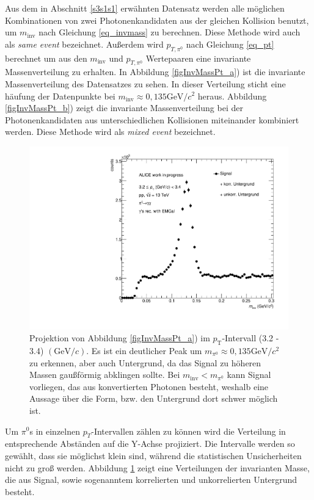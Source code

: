 Aus dem in Abschnitt \ref{s3s1s1} erw{\"a}hnten Datensatz werden alle m{\"o}glichen Kombinationen von zwei Photonenkandidaten aus der gleichen Kollision benutzt, um $m_{\text{inv}}$ nach Gleichung \ref{eq_invmass} zu berechnen.
Diese Methode wird auch als {\it same event} bezeichnet.
Au{\ss}erdem wird $p_{T,\pi^{0}}$ nach Gleichung \ref{eq_pt} berechnet um aus den $m_{\text{inv}}$ und $p_{T,\pi^{0}}$ Wertepaaren eine invariante Massenverteilung zu erhalten.
In Abbildung \ref{figInvMassPt_a}) ist die invariante Massenverteilung des Datensatzes zu sehen.
In dieser Verteilung sticht eine h{\"a}ufung der Datenpunkte bei $m_{\text{inv}}\approx 0,135\text{GeV/}c^{2}$ heraus.
Abbildung \ref{figInvMassPt_b}) zeigt die invariante Massenverteilung bei der Photonenkandidaten aus unterschiedlichen Kollisionen miteinander kombiniert werden.
Diese Methode wird als {\it mixed event} bezeichnet.
\begin{figure}[tbp]
\centering
\includegraphics[width=.6\linewidth]{hSignalPlusBkg.pdf}
\caption{Projektion von Abbildung \ref{figInvMassPt_a}) im $p_{\text{T}}$-Intervall (3.2 - 3.4) $(\text{GeV/}c)$. Es ist ein deutlicher Peak um $m_{\pi^{0}} \approx 0,135\text{GeV/}c^{2}$ zu erkennen, aber auch Untergrund, da das Signal zu h{\"o}heren Massen gau{\ss}f{\"o}rmig abklingen sollte. Bei $m_{\text{inv}} < m_{\pi^{0}}$ kann Signal vorliegen, das aus konvertierten Photonen besteht, weshalb eine Aussage {\"u}ber die Form, bzw. den Untergrund dort schwer m{\"o}glich ist.}
\label{figSignalPlusBkg}
\end{figure}
Um $\pi^{0}$s in einzelnen $p_{T}$-Intervallen z{\"a}hlen zu k{\"o}nnen wird die Verteilung in entsprechende Abst{\"a}nden auf die Y-Achse projiziert.
Die Intervalle werden so gew{\"a}hlt, dass sie m{\"o}glichst klein sind, w{\"a}hrend die statistischen Unsicherheiten nicht zu gro{\ss} werden.
Abbildung \ref{figSignalPlusBkg} zeigt eine Verteilungen der invarianten Masse, die aus Signal, sowie sogenanntem korrelierten und unkorrelierten Untergrund besteht.
